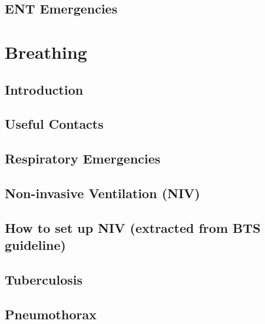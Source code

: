 \documentclass[]{book}
\begin{document}
\hypertarget{ent-emergencies}{%
\section{ENT Emergencies}\label{ent-emergencies}}

\hypertarget{breath}{%
\chapter{Breathing}\label{breath}}

\hypertarget{introduction}{%
\section{Introduction}\label{introduction}}

\hypertarget{useful-contacts}{%
\section{Useful Contacts}\label{useful-contacts}}

\hypertarget{respiratory-emergencies}{%
\section{Respiratory Emergencies}\label{respiratory-emergencies}}

\hypertarget{non-invasive-ventilation-niv}{%
\section{Non-invasive Ventilation (NIV)}\label{non-invasive-ventilation-niv}}

\hypertarget{how-to-set-up-niv-extracted-from-bts-guideline}{%
\section{How to set up NIV (extracted from BTS guideline)}\label{how-to-set-up-niv-extracted-from-bts-guideline}}

\hypertarget{tuberculosis}{%
\section{Tuberculosis}\label{tuberculosis}}

\hypertarget{pneumothorax}{%
\section{Pneumothorax}\label{pneumothorax}}
\end{document}
